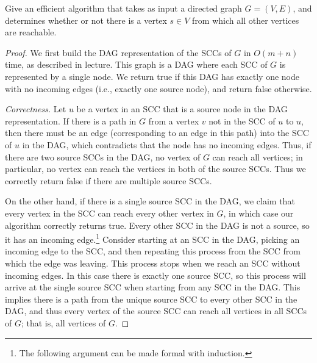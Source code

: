   \begin{exercise}[DPV 3.22] 
    Give an efficient algorithm that takes as input a directed graph $G = (V,E)$, and determines whether or not there is a vertex $s \in V$ from which all other vertices are reachable.
  \end{exercise}
  \begin{proof}
    We first build the DAG representation of the SCCs of $G$ in $O(m+n)$ time, as described in lecture. This graph is a DAG where each SCC of $G$ is represented by a single node. We return true if this DAG has exactly one node with no incoming edges (i.e., exactly one source node), and return false otherwise.

    \textit{Correctness.} Let $u$ be a vertex in an SCC that is a source node in the DAG representation. If there is a path in $G$ from a vertex $v$ not in the SCC of $u$ to $u$, then there must be an edge (corresponding to an edge in this path) into the SCC of $u$ in the DAG, which contradicts that the node has no incoming edges. Thus, if there are two source SCCs in the DAG, no vertex of $G$ can reach all vertices; in particular, no vertex can reach the vertices in both of the source SCCs. Thus we correctly return false if there are multiple source SCCs. 
    
    On the other hand, if there is a single source SCC in the DAG, we claim that every vertex in the SCC can reach every other vertex in $G$, in which case our algorithm correctly returns true. Every other SCC in the DAG is not a source, so it has an incoming edge.\footnote{The following argument can be made formal with induction.} Consider starting at an SCC in the DAG, picking an incoming edge to the SCC, and then repeating this process from the SCC from which the edge was leaving. This process stops when we reach an SCC without incoming edges. In this case there is exactly one source SCC, so this process will arrive at the single source SCC when starting from any SCC in the DAG. This implies there is a path from the unique source SCC to every other SCC in the DAG, and thus every vertex of the source SCC can reach all vertices in all SCCs of $G$; that is, all vertices of $G$.
  \end{proof}

